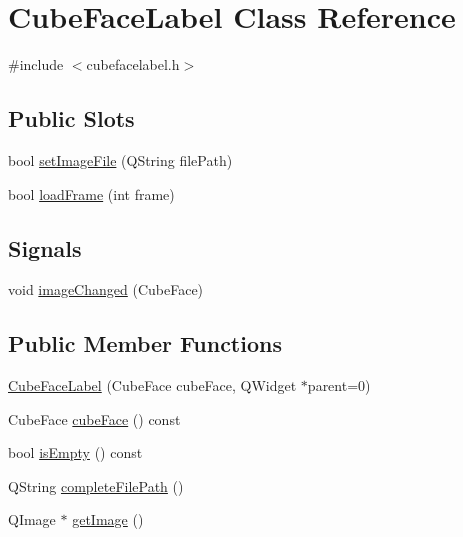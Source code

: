 \hypertarget{class_cube_face_label}{
\section{\-Cube\-Face\-Label \-Class \-Reference}
\label{class_cube_face_label}
}


{\ttfamily \#include $<$cubefacelabel.\-h$>$}

\subsection*{\-Public \-Slots}
\begin{DoxyCompactItemize}
\item 
bool \hyperlink{class_cube_face_label_af08e16abf6ad76b4bde6c39753e76042}{set\-Image\-File} (\-Q\-String file\-Path)
\item 
bool \hyperlink{class_cube_face_label_abbee22f6231a97d27a3daaf986507437}{load\-Frame} (int frame)
\end{DoxyCompactItemize}
\subsection*{\-Signals}
\begin{DoxyCompactItemize}
\item 
void \hyperlink{class_cube_face_label_ab2d9d0095f2fe4ef3683b48f13579292}{image\-Changed} (\-Cube\-Face)
\end{DoxyCompactItemize}
\subsection*{\-Public \-Member \-Functions}
\begin{DoxyCompactItemize}
\item 
\hyperlink{class_cube_face_label_a25a587b5f8503e3147f9833eccbfa3bc}{\-Cube\-Face\-Label} (\-Cube\-Face cube\-Face, \-Q\-Widget $\ast$parent=0)
\item 
\-Cube\-Face \hyperlink{class_cube_face_label_ad9dbd752c2a54a591ee07262f96a0772}{cube\-Face} () const 
\item 
bool \hyperlink{class_cube_face_label_ac18ba054024322d64881f47b11e7756b}{is\-Empty} () const 
\item 
\-Q\-String \hyperlink{class_cube_face_label_a6bb4956612365dab447e1da245167612}{complete\-File\-Path} ()
\item 
\-Q\-Image $\ast$ \hyperlink{class_cube_face_label_ac57414c965f13b9811f9c61a08f47e95}{get\-Image} ()
\end{DoxyCompactItemize}
